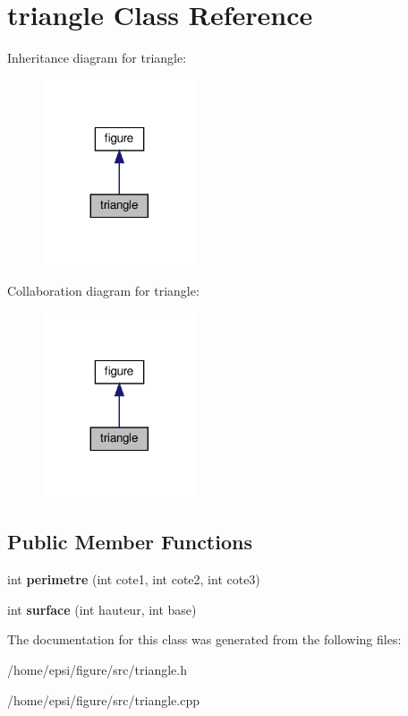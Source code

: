 \hypertarget{classtriangle}{}\section{triangle Class Reference}
\label{classtriangle}


Inheritance diagram for triangle\+:
\nopagebreak
\begin{figure}[H]
\begin{center}
\leavevmode
\includegraphics[width=128pt]{classtriangle__inherit__graph}
\end{center}
\end{figure}


Collaboration diagram for triangle\+:
\nopagebreak
\begin{figure}[H]
\begin{center}
\leavevmode
\includegraphics[width=128pt]{classtriangle__coll__graph}
\end{center}
\end{figure}
\subsection*{Public Member Functions}
\begin{DoxyCompactItemize}
\item 
\mbox{\label{classtriangle_a4b47dbb5ecace0640ab3b3ffb4aba68f}} 
int {\bfseries perimetre} (int cote1, int cote2, int cote3)
\item 
\mbox{\label{classtriangle_a378b6ee932d5373eb84c8a2a24e5e005}} 
int {\bfseries surface} (int hauteur, int base)
\end{DoxyCompactItemize}


The documentation for this class was generated from the following files\+:\begin{DoxyCompactItemize}
\item 
/home/epsi/figure/src/triangle.\+h\item 
/home/epsi/figure/src/triangle.\+cpp\end{DoxyCompactItemize}
